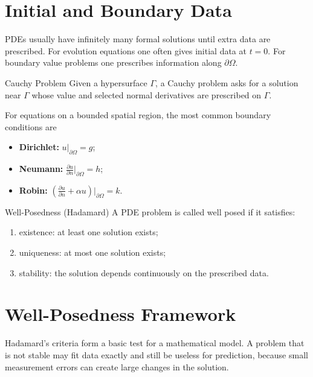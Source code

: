 \section{Initial and Boundary Data}

PDEs usually have infinitely many formal solutions until extra data are prescribed. For evolution equations one often gives initial data at \(t=0\). For boundary value problems one prescribes information along \(\partial\Omega\).

\begin{definitionbox}{Cauchy Problem}
Given a hypersurface \(\Gamma\), a Cauchy problem asks for a solution near \(\Gamma\) whose value and selected normal derivatives are prescribed on \(\Gamma\).
\end{definitionbox}

For equations on a bounded spatial region, the most common boundary conditions are
\begin{itemize}[leftmargin=2.0em]
  \item \textbf{Dirichlet:} \(u|_{\partial\Omega}=g\);
  \item \textbf{Neumann:} \(\frac{\partial u}{\partial n}\big|_{\partial\Omega}=h\);
  \item \textbf{Robin:} \(\left(\frac{\partial u}{\partial n}+\alpha u\right)\big|_{\partial\Omega}=k\).
\end{itemize}

\begin{principlebox}{Well-Posedness (Hadamard)}
A PDE problem is called well posed if it satisfies:
\begin{enumerate}[label=(\alph*),leftmargin=2.2em]
  \item existence: at least one solution exists;
  \item uniqueness: at most one solution exists;
  \item stability: the solution depends continuously on the prescribed data.
\end{enumerate}
\end{principlebox}

\section{Well-Posedness Framework}

Hadamard's criteria form a basic test for a mathematical model. A problem that is not stable may fit data exactly and still be useless for prediction, because small measurement errors can create large changes in the solution.

